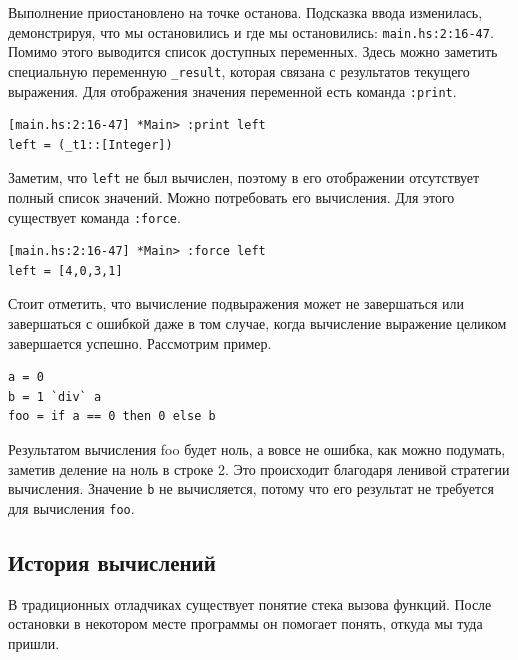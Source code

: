 \documentclass[fontsize=14pt, paper=a4, pagesize, DIV=calc]{scrartcl}
\def\code#1{\texttt{#1}}
\begin{document}
Выполнение приостановлено на точке останова. Подсказка ввода изменилась,
демонстрируя, что мы остановились и где мы остановились:
\code{main.hs:2:16-47}. Помимо этого выводится список доступных переменных.
Здесь можно заметить специальную переменную \code{\_result}, которая связана с
результатов текущего выражения. Для отображения значения переменной есть
команда \code{:print}.

\begin{ListingEnv}
\caption{}
\begin{lstlisting}[numbers=none]
[main.hs:2:16-47] *Main> :print left
left = (_t1::[Integer])
\end{lstlisting}
\end{ListingEnv}

Заметим, что \code{left} не был вычислен, поэтому в его отображении отсутствует
полный список значений. Можно потребовать его вычисления. Для этого существует
команда \code{:force}. 

\begin{ListingEnv}
\caption{}
\begin{lstlisting}[numbers=none]
[main.hs:2:16-47] *Main> :force left
left = [4,0,3,1]
\end{lstlisting}
\end{ListingEnv}

Стоит отметить, что вычисление подвыражения может не завершаться или
завершаться с ошибкой даже в том случае, когда вычисление выражение целиком
завершается успешно. Рассмотрим пример.

\begin{ListingEnv}
\caption{main.hs}
\begin{lstlisting}
a = 0
b = 1 `div` a
foo = if a == 0 then 0 else b
\end{lstlisting}
\end{ListingEnv}

Результатом вычисления foo будет ноль, а вовсе не ошибка, как можно подумать,
заметив деление на ноль в строке 2. Это происходит благодаря ленивой стратегии
вычисления. Значение \code{b} не вычисляется, потому что его результат не
требуется для вычисления \code{foo}.

\subsection{История вычислений}

В традиционных отладчиках существует понятие стека вызова функций. После
остановки в некотором месте программы он помогает понять, откуда мы туда
пришли. 
\end{document}
